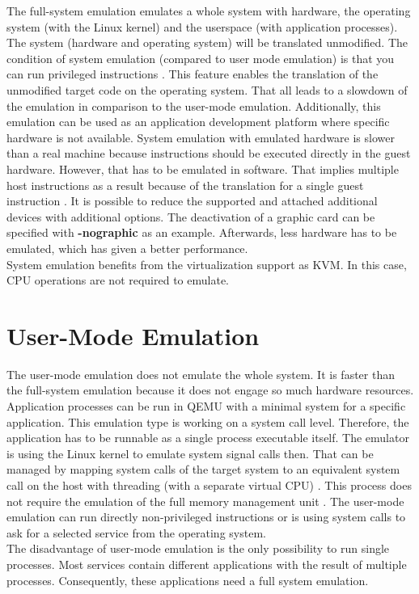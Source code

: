 The full-system emulation emulates a whole system with hardware, the operating system (with the Linux kernel) and the userspace (with application processes). 
The system (hardware and operating system) will be translated unmodified. The condition of system emulation (compared to user mode emulation) is that you can run privileged instructions \cite[~p.2]{Butt2011}. This feature enables the translation of the unmodified target code on the operating system.
That all leads to a slowdown of the emulation in comparison to the user-mode emulation.
Additionally, this emulation can be used as an application development platform where specific hardware is not available. 
System emulation with emulated hardware is slower than a real machine because instructions should be executed directly in the guest hardware.  However, that has to be emulated in software. 
That implies multiple host instructions as a result because of the translation for a single guest instruction \cite[~p.1]{Tong2014}.
It is possible to reduce the supported and attached additional devices with additional options. The deactivation of a graphic card can be specified with \textbf{-nographic} as an example. Afterwards, less hardware has to be emulated, which has given a better performance.  \\
System emulation benefits from the virtualization support as KVM. In this case, CPU operations are not required to emulate.

\section{User-Mode Emulation}

The user-mode emulation does not emulate the whole system. It is faster than the full-system emulation because it does not engage so much hardware resources. Application processes can be run in QEMU with a minimal system for a specific application. 
This emulation type is working on a system call level. Therefore, the application has to be runnable as a single process executable itself. The emulator is using the Linux kernel to emulate system signal calls then. That can be managed by mapping system calls of the target system to an equivalent system call on the host with threading (with a separate virtual CPU) \cite{QEMU}. This process does not require the emulation of the full  memory  management  unit \cite[~p.2]{Butt2011}.
The user-mode emulation can run directly non-privileged instructions or is using system calls to ask for a selected service from the operating system. \\
The disadvantage of user-mode emulation is the only possibility to run single processes. Most services contain different applications with the result of multiple processes. Consequently, these applications need a full system emulation.


